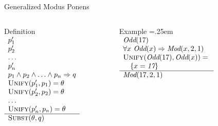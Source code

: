 \documentclass[14pt]{beamer}
\begin{document}
\begin{frame}{Generalized Modus Ponens}
	\begin{columns}[T]
		\begin{column}{1.8in}
			\begin{block}{Definition}
				$
				\begin{array}{l}
				p_1' \\
				p_2' \\
				\ldots \\
				p_n' \\
				p_1 \land p_2 \land \ldots \land p_n \Rightarrow q \\
				\textsc{Unify}(p_1', p_1) = \theta \\
				\textsc{Unify}(p_2', p_2) = \theta \\
				\ldots \\
				\textsc{Unify}(p_n', p_n) = \theta \\
				\hline
				\textsc{Subst}(\theta, q)
				\end{array}
				$
			\end{block}
		\end{column}
		\pause
		\begin{column}{2.4in}
			\begin{block}{Example}
				\extrarowheight=.25em
				$
				\begin{array}{l}
				\textit{Odd}(17) \\
				\forall x\ \textit{Odd}(x) \Rightarrow \textit{Mod}(x, 2, 1) \\
				\textsc{Unify}(\textit{Odd}(17), \textit{Odd}(x)) = \mbox{}\\
				\hspace{1em} \{x = \textit{17}\} \\
				\hline
				\textit{Mod}(17, 2, 1)
				\end{array}
				$
			\end{block}
		\end{column}
	\end{columns}
\end{frame}
\end{document}
